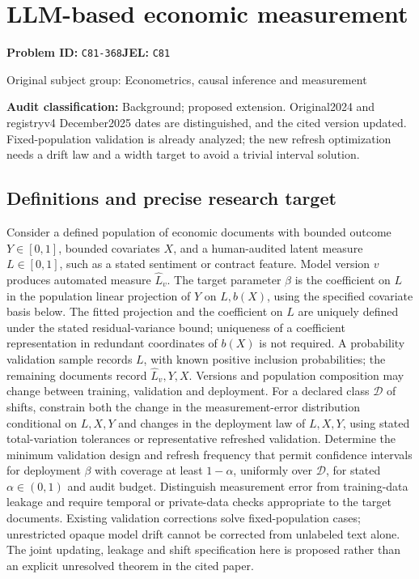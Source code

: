 \documentclass[11pt,a4paper]{article}
\begin{document}
\section*{LLM-based economic measurement}
\textbf{Problem ID:} \texttt{C81-368}\quad \textbf{JEL:} \texttt{C81}\par
\label{problem:OP-0427}
{\sffamily\small\color{muted}Original subject group: Econometrics, causal inference and measurement\par}
\label{definitions:problem:30007709}
\textbf{Audit classification:} Background; proposed extension. Original2024 and registryv4 December2025 dates are distinguished, and the cited version updated. Fixed-population validation is already analyzed; the new refresh optimization needs a drift law and a width target to avoid a trivial interval solution.
\subsection*{Definitions and precise research target}
Consider a defined population of economic documents with bounded outcome \(Y\in[0,1]\), bounded covariates \(X\), and a human-audited latent measure \(L\in[0,1]\), such as a stated sentiment or contract feature. Model version \(v\) produces automated measure \(\widehat L_v\). The target parameter \(\beta\) is the coefficient on \(L\) in the population linear projection of \(Y\) on \(L,b(X)\), using the specified covariate basis below. The fitted projection and the coefficient on \(L\) are uniquely defined under the stated residual-variance bound; uniqueness of a coefficient representation in redundant coordinates of \(b(X)\) is not required. A probability validation sample records \(L\), with known positive inclusion probabilities; the remaining documents record \(\widehat L_v,Y,X\). Versions and population composition may change between training, validation and deployment. For a declared class \(\mathcal D\) of shifts, constrain both the change in the measurement-error distribution conditional on \(L,X,Y\) and changes in the deployment law of \(L,X,Y\), using stated total-variation tolerances or representative refreshed validation. Determine the minimum validation design and refresh frequency that permit confidence intervals for deployment \(\beta\) with coverage at least \(1-\alpha\), uniformly over \(\mathcal D\), for stated \(\alpha\in(0,1)\) and audit budget. Distinguish measurement error from training-data leakage and require temporal or private-data checks appropriate to the target documents. Existing validation corrections solve fixed-population cases; unrestricted opaque model drift cannot be corrected from unlabeled text alone. The joint updating, leakage and shift specification here is proposed rather than an explicit unresolved theorem in the cited paper.
\end{document}
